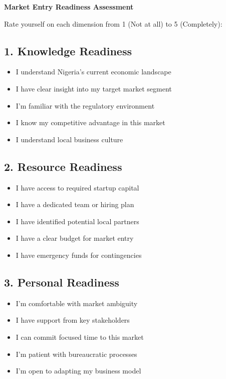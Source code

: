 \begin{workshopbox}
\textbf{Market Entry Readiness Assessment}

Rate yourself on each dimension from 1 (Not at all) to 5 (Completely):

\subsection*{1. Knowledge Readiness}
\begin{itemize}
    \item [ ] I understand Nigeria's current economic landscape
    \item [ ] I have clear insight into my target market segment
    \item [ ] I'm familiar with the regulatory environment
    \item [ ] I know my competitive advantage in this market
    \item [ ] I understand local business culture
\end{itemize}

\subsection*{2. Resource Readiness}
\begin{itemize}
    \item [ ] I have access to required startup capital
    \item [ ] I have a dedicated team or hiring plan
    \item [ ] I have identified potential local partners
    \item [ ] I have a clear budget for market entry
    \item [ ] I have emergency funds for contingencies
\end{itemize}

\subsection*{3. Personal Readiness}
\begin{itemize}
    \item [ ] I'm comfortable with market ambiguity
    \item [ ] I have support from key stakeholders
    \item [ ] I can commit focused time to this market
    \item [ ] I'm patient with bureaucratic processes
    \item [ ] I'm open to adapting my business model
\end{itemize}


\end{workshopbox}
